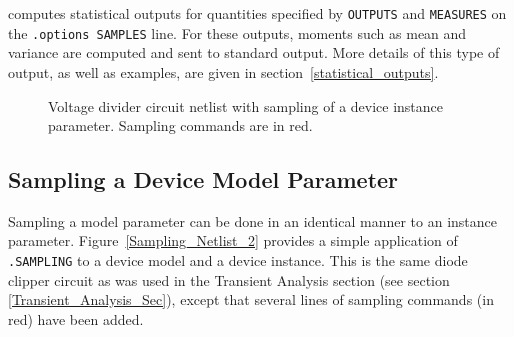 \Xyce{} computes statistical outputs for quantities specified by \texttt{OUTPUTS} 
and \texttt{MEASURES} on the \texttt{.options SAMPLES} line.  For these outputs,
moments such as mean and variance are computed and sent to standard output.  More 
details of this type of output, as well as examples, are given in section~\ref{statistical_outputs}.
\begin{figure}[htbp]
  \fontsize{9pt}{10pt}
\begin{centering}
\caption{Voltage divider circuit netlist with sampling of a device instance parameter.
Sampling commands are in \color{XyceRed}red\color{black}.
\label{Sampling_Netlist_1}}
\end{centering}
\end{figure}

\subsection{Sampling a Device Model Parameter}
\label{sampling_ModelParam}

Sampling a model parameter can be done in an identical manner to an instance parameter.  
Figure~\ref{Sampling_Netlist_2} provides a simple application of \verb|.SAMPLING| to a 
device model and a device instance.  This is the same diode clipper circuit as was used 
in the Transient Analysis section (see section \ref{Transient_Analysis_Sec}), except that 
several lines of sampling commands (in red) have been added.  

